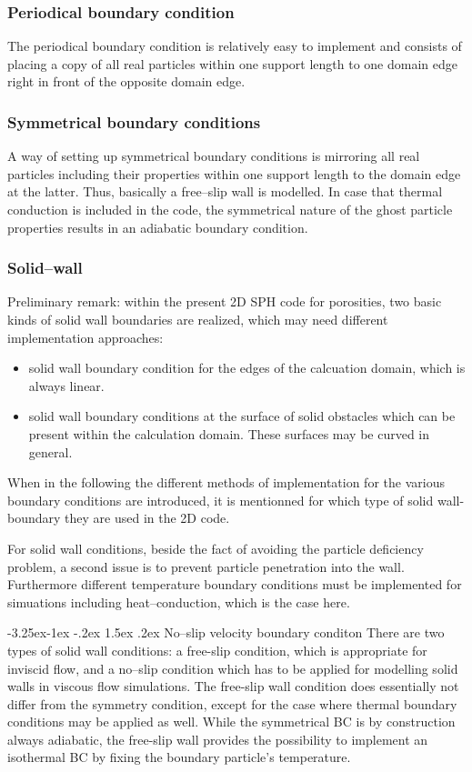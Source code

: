 \documentclass{report}
\makeatletter
\renewcommand\paragraph{\@startsection{paragraph}{4}{\z@}%
  {-3.25ex\@plus -1ex \@minus -.2ex}%
  {1.5ex \@plus .2ex}%
  {\normalfont\normalsize\bfseries}}
\makeatother
\begin{document}
\subsubsection{Periodical boundary condition}
The periodical boundary condition is relatively easy to implement and consists of placing a copy of all real particles within one support length to one domain edge right in front of the opposite domain edge.



\subsubsection{Symmetrical boundary conditions}
A way of setting up symmetrical boundary conditions is mirroring all real particles including their properties within one support length to the domain edge at the latter. Thus, basically a free--slip wall is modelled. In case that thermal conduction is included in the code, the symmetrical nature of the ghost particle properties results in an adiabatic boundary condition.

\subsubsection{Solid--wall}
Preliminary remark: within the present 2D SPH code for porosities, two basic kinds of solid wall boundaries are realized, which may need different implementation approaches:
\begin{itemize}
 \item solid wall boundary condition for the edges of the calcuation domain, which is always linear.
\item solid wall boundary conditions at the surface of solid obstacles which can be present within the calculation domain. These surfaces may be curved in general. 
\end{itemize}
When in the following the different methods of implementation for the various boundary conditions are introduced, it is mentionned for which type of solid wall-boundary they are used in the 2D code. 

For solid wall conditions, beside the fact of avoiding the particle deficiency problem, a second issue is to prevent particle penetration into the wall.
Furthermore different temperature boundary conditions must be implemented for simuations including heat--conduction, which is the case here.

\paragraph{No--slip velocity boundary conditon}
There are two types of solid wall conditions: a free-slip condition, which is appropriate for inviscid flow, and a no--slip condition which has to be applied for modelling solid walls in viscous flow simulations. The free-slip wall condition does essentially not differ from the symmetry condition, except for the case where thermal boundary conditions may be applied as well. While the symmetrical BC is by construction always adiabatic, the free-slip wall provides the possibility to implement an isothermal BC by fixing the boundary particle's temperature.
\end{document}
